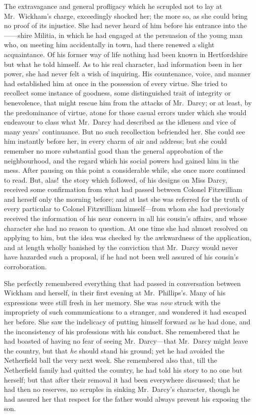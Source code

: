\documentclass[12pt,english]{book}
\begin{document}
The extravagance and general profligacy which he scrupled not to lay
at Mr.\ Wickham's charge, exceedingly shocked her; the more so, as
she could bring no proof of its injustice. She had never heard of
him before his entrance into the \mbox{------}shire Militia, in which
he had engaged at the persuasion of the young man who, on meeting
him accidentally in town, had there renewed a slight acquaintance.
Of his former way of life nothing had been known in Hertfordshire
but what he told himself. As to his real character, had information
been in her power, she had never felt a wish of inquiring. His countenance,
voice, and manner had established him at once in the possession of
every virtue. She tried to recollect some instance of goodness, some
distinguished trait of integrity or benevolence, that might rescue
him from the attacks of Mr.\ Darcy; or at least, by the predominance
of virtue, atone for those casual errors under which she would endeavour
to class what Mr.\ Darcy had described as the idleness and vice of
many years' continuance. But no such recollection befriended her.
She could see him instantly before her, in every charm of air and
address; but she could remember no more substantial good than the
general approbation of the neighbourhood, and the regard which his
social powers had gained him in the mess. After pausing on this point
a considerable while, she once more continued to read. But, alas!\ the
story which followed, of his designs on Miss Darcy, received some
confirmation from what had passed between Colonel Fitzwilliam and
herself only the morning before; and at last she was referred for
the truth of every particular to Colonel Fitzwilliam himself\mbox{---}from
whom she had previously received the information of his near concern
in all his cousin's affairs, and whose character she had no reason
to question. At one time she had almost resolved on applying to him,
but the idea was checked by the awkwardness of the application, and
at length wholly banished by the conviction that Mr.\ Darcy would
never have hazarded such a proposal, if he had not been well assured
of his cousin's corroboration.

She perfectly remembered everything that had passed in conversation
between Wickham and herself, in their first evening at Mr.\ Phillips's.
Many of his expressions were still fresh in her memory. She was \textit{now}
struck with the impropriety of such communications to a stranger,
and wondered it had escaped her before. She saw the indelicacy of
putting himself forward as he had done, and the inconsistency of his
professions with his conduct. She remembered that he had boasted of
having no fear of seeing Mr.\ Darcy\mbox{---}that Mr.\ Darcy might
leave the country, but that \textit{he} should stand his ground; yet
he had avoided the Netherfield ball the very next week. She remembered
also that, till the Netherfield family had quitted the country, he
had told his story to no one but herself; but that after their removal
it had been everywhere discussed; that he had then no reserves, no
scruples in sinking Mr.\ Darcy's character, though he had assured
her that respect for the father would always prevent his exposing
the son.
\end{document}
